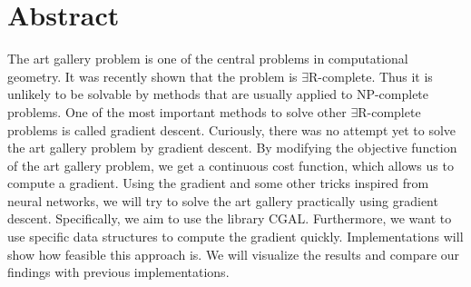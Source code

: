 \section*{Abstract}


The art gallery problem is one of the central problems in computational geometry. It was recently shown that the problem is $\exists$R-complete. Thus it is unlikely to be solvable by methods that are usually applied to NP-complete problems. One of the most important methods to solve other $\exists$R-complete problems is called gradient descent. Curiously, there was no attempt yet to solve the art gallery problem by gradient descent. By modifying the objective function of the art gallery problem, we get a continuous cost function, which allows us to compute a gradient. Using the gradient and some other tricks inspired from neural networks, we will try to solve the art gallery practically using gradient descent. Specifically, we aim to use the library CGAL. Furthermore, we want to use specific data structures to compute the gradient quickly. Implementations will show how feasible this approach is. We will visualize the results and compare our findings with previous implementations.